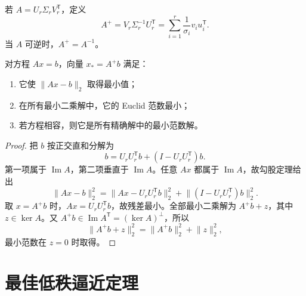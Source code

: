 \begin{definition}
若 $A=U_r\Sigma_rV_r^{\mathsf T}$，定义
\[
A^+=V_r\Sigma_r^{-1}U_r^{\mathsf T}
=\sum_{i=1}^r\frac1{\sigma_i}v_iu_i^{\mathsf T}.
\]
当 $A$ 可逆时，$A^+=A^{-1}$。
\end{definition}

\begin{proposition}[最小二乘与最小范数解]
对方程 $Ax=b$，向量 $x_*=A^+b$ 满足：
\begin{enumerate}
\item 它使 $\lVert Ax-b\rVert_2$ 取得最小值；
\item 在所有最小二乘解中，它的 Euclid 范数最小；
\item 若方程相容，则它是所有精确解中的最小范数解。
\end{enumerate}
\end{proposition}
\begin{proof}
把 $b$ 按正交直和分解为
\[
b=U_rU_r^{\mathsf T}b+(I-U_rU_r^{\mathsf T})b.
\]
第一项属于 $\operatorname{Im}A$，第二项垂直于 $\operatorname{Im}A$。任意 $Ax$ 都属于 $\operatorname{Im}A$，故勾股定理给出
\[
\lVert Ax-b\rVert_2^2
=\lVert Ax-U_rU_r^{\mathsf T}b\rVert_2^2
+\lVert(I-U_rU_r^{\mathsf T})b\rVert_2^2.
\]
取 $x=A^+b$ 时，$Ax=U_rU_r^{\mathsf T}b$，故残差最小。全部最小二乘解为 $A^+b+z$，其中 $z\in\ker A$。又 $A^+b\in\operatorname{Im}A^{\mathsf T}=(\ker A)^\perp$，所以
\[
\lVert A^+b+z\rVert_2^2=\lVert A^+b\rVert_2^2+\lVert z\rVert_2^2,
\]
最小范数在 $z=0$ 时取得。
\end{proof}

\section{最佳低秩逼近定理}

